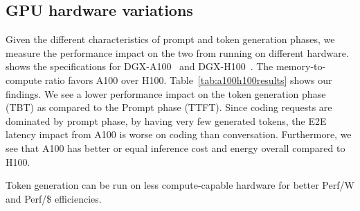 \subsection{GPU hardware variations}
Given the different characteristics of prompt and token generation phases, we measure the performance impact on the two from running on different hardware.
 shows the specifications for DGX-A100~\cite{nvidia_dgx_a100} and DGX-H100~\cite{dgxh100}. The memory-to-compute ratio favors A100 over H100.
Table~\ref{tab:a100h100results} shows our findings. 
We see a lower performance impact on the token generation phase (TBT) as compared to the Prompt phase (TTFT).
Since coding requests are dominated by prompt phase, by having very few generated tokens, the E2E latency impact from A100 is worse on coding than conversation.
Furthermore, we see that A100 has better or equal inference cost and energy overall compared to H100.

Token generation can be run on less compute-capable hardware for better Perf/W and Perf/\$ efficiencies.



